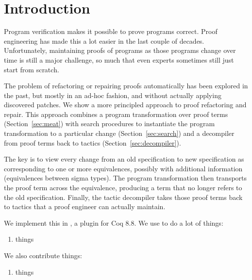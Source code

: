 \section{Introduction}

Program verification makes it possible to prove programs correct.
Proof engineering has made this a lot easier in the last couple of decades.
Unfortunately, maintaining proofs of programs as those programs change over
time is still a major challenge,
so much that even experts sometimes still just start from scratch.

The problem of refactoring or repairing proofs automatically has been explored in the past,
but mostly in an ad-hoc fashion, and without actually applying discovered patches.
We show a more principled approach to proof refactoring and repair. %
This approach combines a program transformation over proof terms (Section~\ref{sec:meat})
with search procedures to instantiate the program transformation to a particular change (Section~\ref{sec:search})
and a decompiler from proof terms back to tactics (Section~\ref{sec:decompiler}).

The key is to view every change from an old specification to new specification as corresponding to one or more equivalences,
possibly with additional information (equivalences between sigma types).
The program transformation then transports the proof term across the equivalence,
producing a term that no longer refers to the old specification.
Finally, the tactic decompiler takes those proof terms back to tactics that a proof engineer
can actually maintain.

We implement this in \toolname, a plugin for Coq 8.8. We use \toolname to do a lot of things:

\begin{enumerate}
  \item things
\end{enumerate}

We also contribute things:

\begin{enumerate}
\item things
\end{enumerate}
